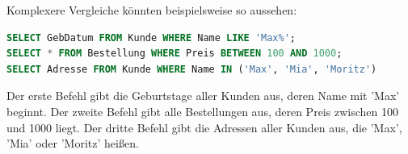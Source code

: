 \documentclass[11pt, a4paper, oneside]{article}
\begin{document}
	\pagebreak
	
	Komplexere Vergleiche könnten beispielsweise so aussehen:
	
	\begin{lstlisting}[language=sql]
SELECT GebDatum FROM Kunde WHERE Name LIKE 'Max%';
SELECT * FROM Bestellung WHERE Preis BETWEEN 100 AND 1000;
SELECT Adresse FROM Kunde WHERE Name IN ('Max', 'Mia', 'Moritz')
	\end{lstlisting}
	
	Der erste Befehl gibt die Geburtstage aller Kunden aus, deren Name mit 'Max' beginnt.
	Der zweite Befehl gibt alle Bestellungen aus, deren Preis zwischen 100 und 1000 liegt.
	Der dritte Befehl gibt die Adressen aller Kunden aus, die 'Max', 'Mia' oder 'Moritz' heißen.
	
%	
%	
%	
%		
%		
%		
\end{document}
